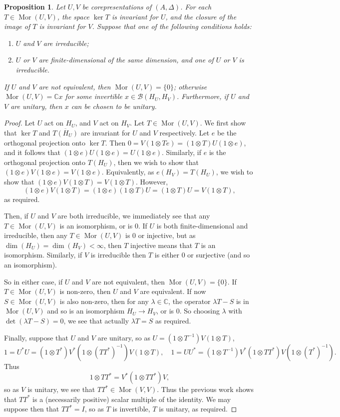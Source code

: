 \documentclass[twoside,a4paper,12pt]{article}
\theoremstyle{plain}
\newtheorem{proposition}{Proposition}[section]
\theoremstyle{definition}
\newcommand{\mc}{\mathcal}
\newcommand{\mor}{\operatorname{Mor}}
\begin{document}
\begin{proposition}\label{prop:schur}
Let $U,V$ be corepresentations of $(A,\Delta)$.  For each $T\in\mor(U,V)$,
the space $\ker T$ is invariant for $U$, and the closure of the image of $T$
is invariant for $V$.  Suppose that one of the following conditions holds:
\begin{enumerate}
\item $U$ and $V$ are irreducible;
\item $U$ or $V$ are finite-dimensional of the same dimension, and one of
$U$ or $V$ is irreducible.
\end{enumerate}
If $U$ and $V$ are not equivalent, then $\mor(U,V)=\{0\}$; otherwise
$\mor(U,V)=\mathbb C x$ for some invertible $x\in\mc B(H_U,H_V)$.  Furthermore,
if $U$ and $V$ are unitary, then $x$ can be chosen to be unitary.
\end{proposition}
\begin{proof}
Let $U$ act on $H_U$, and $V$ act on $H_V$.  Let $T\in\mor(U,V)$.  We first
show that $\ker T$ and $\overline{T(H_U)}$ are invariant for $U$ and $V$
respectively.  Let $e$ be the orthogonal projection onto $\ker T$.  Then
$0 = V(1\otimes Te) = (1\otimes T)U(1\otimes e)$, and it follows that
$(1\otimes e)U(1\otimes e) = U (1\otimes e)$.  Similarly, if $e$ is the
orthogonal projection onto $T(H_U)$, then we wish to show that
$(1\otimes e)V(1\otimes e) = V(1\otimes e)$.  Equivalently, as
$e(H_V)=T(H_U)$, we wish to show that $(1\otimes e)V(1\otimes T) =
V(1\otimes T)$.  However, 
\[ (1\otimes e)V(1\otimes T) = (1\otimes e)(1\otimes T)U
= (1\otimes T)U = V(1\otimes T), \]
as required.

Then, if $U$ and $V$ are both irreducible, we immediately see that any
$T\in\mor(U,V)$ is an isomorphism, or is $0$.
If $U$ is both finite-dimensional and irreducible, then any $T\in\mor(U,V)$
is $0$ or injective, but as $\dim(H_U)=\dim(H_V)<\infty$, then $T$ injective
means that $T$ is an isomorphism.  Similarly, if $V$ is irreducible then $T$ is
either $0$ or surjective (and so an isomorphism).

So in either case, if $U$ and $V$ are not equivalent, then $\mor(U,V)=\{0\}$.
If $T\in\mor(U,V)$ is non-zero, then $U$ and $V$ are equivalent.  If now
$S\in\mor(U,V)$ is also non-zero, then for any
$\lambda\in\mathbb C$, the operator $\lambda T-S$ is in $\mor(U,V)$ and so
is an isomorphism $H_U\rightarrow H_V$, or is $0$.  So choosing $\lambda$
with $\det(\lambda T-S)=0$, we see that actually $\lambda T=S$ as required.

Finally, suppose that $U$ and $V$ are unitary, so as $U = (1\otimes T^{-1}) V
(1\otimes T)$,
\[ 1 = U^*U = (1\otimes T^*)V^*(1\otimes (TT^*)^{-1}) V (1\otimes T), \quad
1 = UU^* = (1\otimes T^{-1}) V^* (1\otimes TT^*) V (1\otimes (T^*)^{-1}). \]
Thus
\[ 1\otimes TT^* = V^*(1\otimes TT^*) V, \]
so as $V$ is unitary, we see that $TT^*\in\mor(V,V)$.  Thus the previous work
shows that $TT^*$ is a (necessarily positive) scalar multiple of the identity.
We may suppose then that $TT^*=I$, so as $T$ is invertible, $T$ is
unitary, as required.
\end{proof}
\end{document}
